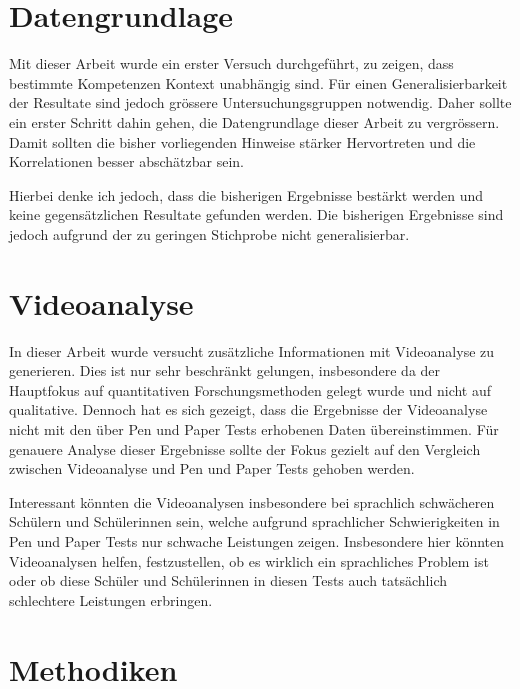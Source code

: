 \section{Datengrundlage}

Mit dieser Arbeit wurde ein erster Versuch durchgeführt, zu zeigen, dass bestimmte Kompetenzen Kontext unabhängig sind. Für einen Generalisierbarkeit der Resultate sind jedoch grössere Untersuchungsgruppen notwendig. Daher sollte ein erster Schritt dahin gehen, die Datengrundlage dieser Arbeit zu vergrössern. Damit sollten die bisher vorliegenden Hinweise stärker Hervortreten und die Korrelationen besser abschätzbar sein.

Hierbei denke ich jedoch, dass die bisherigen Ergebnisse bestärkt werden und keine gegensätzlichen Resultate gefunden werden. Die bisherigen Ergebnisse sind jedoch aufgrund der zu geringen Stichprobe nicht generalisierbar. 




\section{Videoanalyse}

In dieser Arbeit wurde versucht zusätzliche Informationen mit Videoanalyse zu generieren. Dies ist nur sehr beschränkt gelungen, insbesondere da der Hauptfokus auf quantitativen Forschungsmethoden gelegt wurde und nicht auf qualitative. Dennoch hat es sich gezeigt, dass die Ergebnisse der Videoanalyse nicht mit den über  Pen und Paper Tests erhobenen Daten übereinstimmen. Für genauere Analyse dieser Ergebnisse sollte der Fokus gezielt auf den Vergleich zwischen Videoanalyse und Pen und Paper Tests gehoben werden. 

Interessant könnten die Videoanalysen insbesondere bei sprachlich schwächeren Schülern und Schülerinnen sein, welche aufgrund sprachlicher Schwierigkeiten in Pen und Paper Tests nur schwache Leistungen zeigen. Insbesondere hier könnten Videoanalysen helfen, festzustellen, ob es wirklich ein sprachliches Problem ist oder ob diese Schüler und Schülerinnen in diesen Tests auch tatsächlich schlechtere Leistungen erbringen.

\section{Methodiken}

